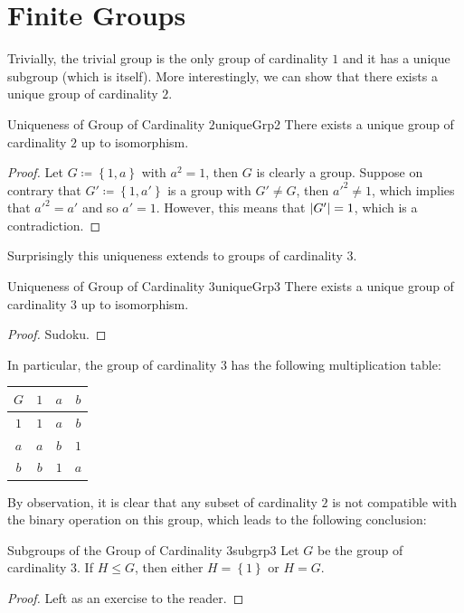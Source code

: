 \documentclass[math]{amznotes}
\theoremstyle{remark}
\newcommand{\0}{\mathbf{0}}
\newcommand{\1}{\mathbf{1}}
\begin{document}
\section{Finite Groups}
Trivially, the trivial group is the only group of cardinality $1$ and it has a unique subgroup (which is itself). More interestingly, we can show that there exists a unique group of cardinality $2$.
\begin{probox}{Uniqueness of Group of Cardinality $2$}{uniqueGrp2}
    There exists a unique group of cardinality $2$ up to isomorphism.
    \tcblower
    \begin{proof}
        Let $G \coloneqq \left\{1, a\right\}$ with $a^2 = 1$, then $G$ is clearly a group. Suppose on contrary that $G' \coloneqq \left\{1, a'\right\}$ is a group with $G' \neq G$, then ${a'}^2 \neq 1$, which implies that ${a'}^2 = a'$ and so $a' = 1$. However, this means that ${\left\lvert {G'} \right\rvert} = 1$, which is a contradiction.
    \end{proof}
\end{probox}
Surprisingly this uniqueness extends to groups of cardinality $3$.
\begin{probox}{Uniqueness of Group of Cardinality $3$}{uniqueGrp3}
    There exists a unique group of cardinality $3$ up to isomorphism.
    \tcblower
    \begin{proof}
        Sudoku.
    \end{proof}    
\end{probox}
In particular, the group of cardinality $3$ has the following multiplication table:
\begin{center}
    \begin{tabular}{c|ccc}
        $G$ & $1$ & $a$ & $b$ \\
        \hline
        $1$ & $1$ & $a$ & $b$ \\
        $a$ & $a$ & $b$ & $1$ \\
        $b$ & $b$ & $1$ & $a$
    \end{tabular}
\end{center}
By observation, it is clear that any subset of cardinality $2$ is not compatible with the binary operation on this group, which leads to the following conclusion:
\begin{probox}{Subgroups of the Group of Cardinality $3$}{subgrp3}
    Let $G$ be the group of cardinality $3$. If $H \leq G$, then either $H = \left\{1\right\}$ or $H = G$.
    \tcblower
    \begin{proof}
        Left as an exercise to the reader.
    \end{proof}
\end{probox}
\end{document}
